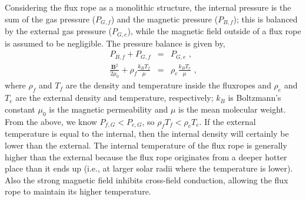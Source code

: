 Considering the  flux rope as a monolithic structure, the internal pressure is the sum of the gas pressure ($P_{G,f}$) and the magnetic pressure ($P_{B,f}$); this is balanced by the external gas pressure ($P_{G,e}$), while the magnetic field outside of a flux rope is assumed to be negligible. The pressure balance is given by,
\begin{eqnarray}\label{pressbalance}
P_{B,f} + P_{G,f} &=& P_{G,e} \mbox{ ,} \\
\frac{\mathbf{B}^{2}}{2\mu_0} + \rho_{f} \frac{k_{B} T_{f}}{\mu} &=& \rho_{e}\frac{k_{B} T_{e}}{\mu} \mbox{ ,}
\end{eqnarray}
where $\rho_{f}$ and $T_{f}$ are the density and temperature inside the \glspl{fluxrope} and $\rho_{e}$ and $T_{e}$ are the external density and temperature, respectively; $k_{B}$ is Boltzmann's constant $\mu_0$ is the magnetic permeability and $\mu$ is the mean molecular weight. From the above, we know $P_{f,G} < P_{e,G}$, so $\rho_{f} T_{f} < \rho_{e} T_{e}$. If the external temperature is equal to the internal, then the internal density will certainly be lower than the external. The internal temperature of the flux rope is generally higher than the external because the flux rope originates from a deeper hotter place than it ends up (i.e., at larger solar radii where the temperature is lower). Also the strong magnetic field inhibits cross-field conduction, allowing the flux rope to maintain its higher temperature. %


